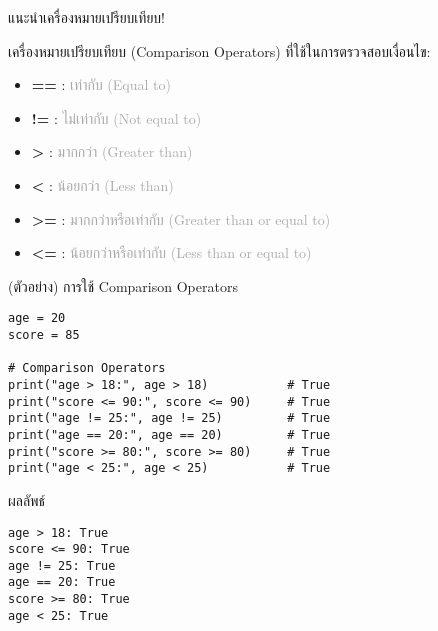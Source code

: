 \documentclass[12pt,a4paper]{article}
\newcommand{\textlight}[1]{{\thailightfont #1}}
\begin{document}
\begin{noticebox}{แนะนำเครื่องหมายเปรียบเทียบ!}

\textlight{เครื่องหมายเปรียบเทียบ (Comparison Operators) ที่ใช้ในการตรวจสอบเงื่อนไข:}

\begin{itemize}
    \item \textbf{==} : \textcolor{darkgray}{เท่ากับ (Equal to)}
    \item \textbf{!=} : \textcolor{darkgray}{ไม่เท่ากับ (Not equal to)}
    \item \textbf{>} : \textcolor{darkgray}{มากกว่า (Greater than)}
    \item \textbf{<} : \textcolor{darkgray}{น้อยกว่า (Less than)}
    \item \textbf{>=} : \textcolor{darkgray}{มากกว่าหรือเท่ากับ (Greater than or equal to)}
    \item \textbf{<=} : \textcolor{darkgray}{น้อยกว่าหรือเท่ากับ (Less than or equal to)}
\end{itemize}

\begin{codebox}{(ตัวอย่าง) การใช้ Comparison Operators}
\begin{lstlisting}[style=python]
age = 20
score = 85

# Comparison Operators
print("age > 18:", age > 18)           # True
print("score <= 90:", score <= 90)     # True
print("age != 25:", age != 25)         # True
print("age == 20:", age == 20)         # True
print("score >= 80:", score >= 80)     # True
print("age < 25:", age < 25)           # True
\end{lstlisting}
\end{codebox}

\begin{resultbox}{ผลลัพธ์}
\begin{verbatim}
age > 18: True
score <= 90: True
age != 25: True
age == 20: True
score >= 80: True
age < 25: True
\end{verbatim}
\end{resultbox}

\end{noticebox}
\end{document}
